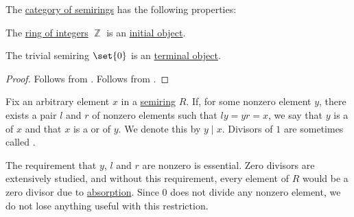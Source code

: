 \begin{proposition}\label{thm:category_of_semirings_properties}
  The \hyperref[def:semiring/category]{category of semirings} has the following properties:
  \begin{thmenum}
     The \hyperref[def:set_of_integers]{ring of integers} \( \BbbZ \) is an \hyperref[def:universal_objects/initial]{initial object}.

     The trivial semiring \( \set{ 0 } \) is an \hyperref[def:universal_objects/terminal]{terminal object}.
  \end{thmenum}
\end{proposition}
\begin{proof}
   Follows from .
   Follows from .
\end{proof}

\begin{definition}\label{def:semiring_division}\mimprovised
  Fix an arbitrary element \( x \) in a \hyperref[def:semiring]{semiring} \( R \). If, for some nonzero element \( y \), there exists a pair \( l \) and \( r \) of nonzero elements such that \( l y = y r = x \), we say that \( y \) is a  of \( x \) and that \( x \) is a  or  of \( y \). We denote this by \( y \mid x \). Divisors of \( 1 \) are sometimes called .

  The requirement that \( y \), \( l \) and \( r \) are nonzero is essential. Zero divisors are extensively studied, and without this requirement, every element of \( R \) would be a zero divisor due to \hyperref[def:semiring/absorption]{absorption}. Since \( 0 \) does not divide any nonzero element, we do not lose anything useful with this restriction.
\end{definition}

